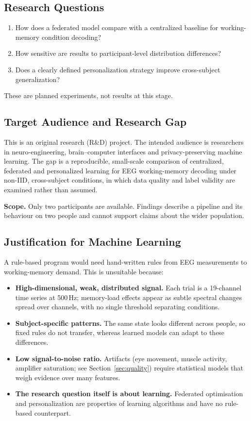 \documentclass[11pt,a4paper]{article}
\begin{document}
\subsection{Research Questions}
\begin{enumerate}[leftmargin=*]
  \item How does a federated model compare with a centralized baseline for working-memory condition decoding?
  \item How sensitive are results to participant-level distribution differences?
  \item Does a clearly defined personalization strategy improve cross-subject generalization?
\end{enumerate}
These are planned experiments, not results at this stage.

\subsection{Target Audience and Research Gap}
This is an original research (R\&D) project. The intended audience is researchers in neuro-engineering,
brain--computer interfaces and privacy-preserving machine learning. The gap is a reproducible, small-scale comparison
of centralized, federated and personalized learning for EEG working-memory decoding under non-IID, cross-subject
conditions, in which data quality and label validity are examined rather than assumed.

\textbf{Scope.} Only two participants are available. Findings describe a pipeline and its behaviour on two people and
cannot support claims about the wider population.

\subsection{Justification for Machine Learning}
A rule-based program would need hand-written rules from EEG measurements to working-memory demand. This is unsuitable
because:
\begin{itemize}[leftmargin=*]
  \item \textbf{High-dimensional, weak, distributed signal.} Each trial is a 19-channel time series at 500\,Hz;
  memory-load effects appear as subtle spectral changes spread over channels, with no single threshold separating
  conditions.
  \item \textbf{Subject-specific patterns.} The same state looks different across people, so fixed rules do not transfer,
  whereas learned models can adapt to these differences.
  \item \textbf{Low signal-to-noise ratio.} Artifacts (eye movement, muscle activity, amplifier saturation; see
  Section~\ref{sec:quality}) require statistical models that weigh evidence over many features.
  \item \textbf{The research question itself is about learning.} Federated optimisation and personalization are
  properties of learning algorithms and have no rule-based counterpart.
\end{itemize}
\end{document}

